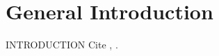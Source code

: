 \chapter{General Introduction}
\setcounter{page}{1}
INTRODUCTION
Cite \cite{authorjear}, \citep{authorjear}.
